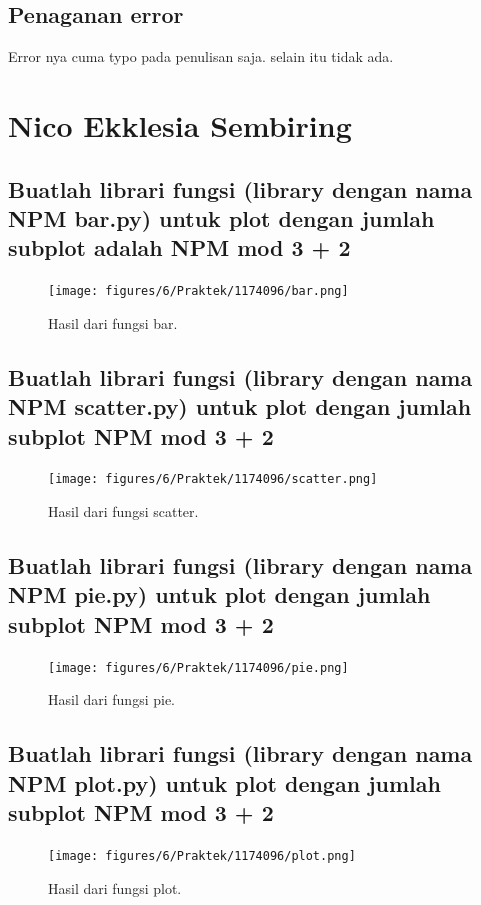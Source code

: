 

\subsection{Penaganan error}
Error nya cuma typo pada penulisan saja. selain itu tidak ada.
\section{Nico Ekklesia Sembiring}
\subsection{Buatlah librari fungsi (library dengan nama NPM bar.py) untuk plot dengan jumlah subplot adalah NPM mod 3 + 2}

\begin{figure}[H]
	\texttt{[image: figures/6/Praktek/1174096/bar.png]}
	\caption{Hasil dari fungsi bar.}
	\centering
\end{figure}

\subsection{Buatlah librari fungsi (library dengan nama NPM scatter.py) untuk plot dengan jumlah subplot NPM mod 3 + 2}

\begin{figure}[H]
	\texttt{[image: figures/6/Praktek/1174096/scatter.png]}
	\caption{Hasil dari fungsi scatter.}
	\centering
\end{figure}

\subsection{Buatlah librari fungsi (library dengan nama NPM pie.py) untuk plot dengan jumlah subplot NPM mod 3 + 2}

\begin{figure}[H]
	\texttt{[image: figures/6/Praktek/1174096/pie.png]}
	\caption{Hasil dari fungsi pie.}
	\centering
\end{figure}

\subsection{Buatlah librari fungsi (library dengan nama NPM plot.py) untuk plot dengan jumlah subplot NPM mod 3 + 2}

\begin{figure}[H]
	\texttt{[image: figures/6/Praktek/1174096/plot.png]}
	\caption{Hasil dari fungsi plot.}
	\centering
\end{figure}

